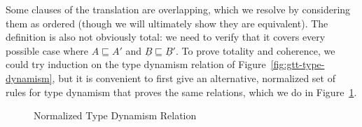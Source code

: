 \documentclass[acmsmall,screen,12pt]{acmart}
\renewcommand{\u}{\underline}
\newcommand{\floor}[1]{\lfloor#1\rfloor}
\newcommand{\ltdyn}{\sqsubseteq}
\newcommand{\dynv}{{?}}
\newcommand{\dync}{\u {\text{?`}}}
\newcommand{\with}{\mathbin{\&}}
\begin{document}
\begin{longonly}
Some clauses of the translation are overlapping, which we resolve by
considering them as ordered (though we will ultimately show they are
equivalent).
%
The definition is also not obviously total: we need to verify that it
covers every possible case where $A \ltdyn A'$ and $\u B \ltdyn \u
B'$.
%
To prove totality and coherence, we could try induction on the type
dynamism relation of Figure~\ref{fig:gtt-type-dynamism}, but it is
convenient to first give an alternative, normalized set of rules for
type dynamism that proves the same relations, which we do in
Figure~\ref{fig:normalized}.

\begin{figure}
\begin{small}
  \end{small}
  \caption{Normalized Type Dynamism Relation}
  \label{fig:normalized}
\end{figure}


\end{longonly}
\end{document}
